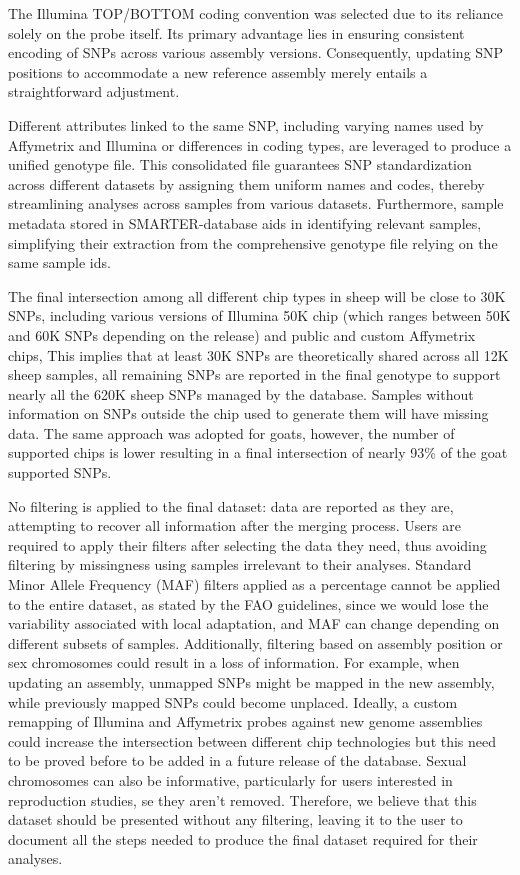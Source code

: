 \documentclass[a4paper,num-refs,gigabyte]{oup-contemporary}
\begin{document}
The Illumina TOP/BOTTOM coding convention was selected due to its reliance solely on the probe itself\citep{IlluminaTOP}. Its primary advantage lies in ensuring consistent encoding of SNPs across various assembly versions. Consequently, updating SNP positions to accommodate a new reference assembly merely entails a straightforward adjustment.

Different attributes linked to the same SNP, including varying names used by Affymetrix and Illumina or differences in coding types, are leveraged to produce a unified genotype file. This consolidated file guarantees SNP standardization across different datasets by assigning them uniform names and codes, thereby streamlining analyses across samples from various datasets. Furthermore, sample metadata stored in SMARTER-database aids in identifying relevant samples, simplifying their extraction from the comprehensive genotype file relying on the same sample ids.

The final intersection among all different chip types in sheep will be close to 30K SNPs, including various versions of Illumina 50K chip (which ranges between 50K and 60K SNPs depending on the release) and public and custom Affymetrix chips, This implies that at least 30K SNPs are theoretically shared across all 12K sheep samples, all remaining SNPs are reported in the final genotype to support nearly all the 620K sheep SNPs managed by the database. Samples without information on SNPs outside the chip used to generate them will have missing data. The same approach was adopted for goats, however, the number of supported chips is lower resulting in a final intersection of nearly 93\% of the goat supported SNPs.

No filtering is applied to the final dataset: data are reported as they are, attempting to recover all information after the merging process. Users are required to apply their filters after selecting the data they need, thus avoiding filtering by missingness using samples irrelevant to their analyses. Standard Minor Allele Frequency (MAF) filters applied as a percentage cannot be applied to the entire dataset, as stated by the FAO guidelines\citep{Ajmone23}, since we would lose the variability associated with local adaptation, and MAF can change depending on different subsets of samples. Additionally, filtering based on assembly position or sex chromosomes could result in a loss of information. For example, when updating an assembly, unmapped SNPs might be mapped in the new assembly, while previously mapped SNPs could become unplaced. Ideally, a custom remapping of Illumina and Affymetrix probes against new genome assemblies could increase the intersection between different chip technologies but this need to be proved before to be added in a future release of the database. Sexual chromosomes can also be informative, particularly for users interested in reproduction studies, se they aren't removed. Therefore, we believe that this dataset should be presented without any filtering, leaving it to the user to document all the steps needed to produce the final dataset required for their analyses.
\end{document}
